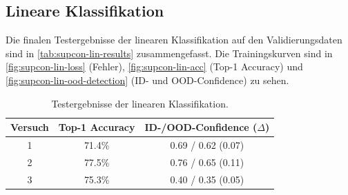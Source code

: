 \subsection{Lineare Klassifikation} \label{subsec:supcon-lin-results}

Die finalen Testergebnisse der linearen Klassifikation auf den Validierungsdaten sind in \autoref{tab:supcon-lin-results} zusammengefasst. Die Trainingskurven sind in \autoref{fig:supcon-lin-loss} (Fehler), \autoref{fig:supcon-lin-acc} (Top-1 Accuracy) und \autoref{fig:supcon-lin-ood-detection} (ID- und OOD-Confidence) zu sehen.

\begin{table}[h]
	\caption{Testergebnisse der linearen Klassifikation.}
	\begin{tabular}{|c|c|c|}
		\hline
		\textbf{Versuch} & \textbf{Top-1 Accuracy} & \textbf{ID-/OOD-Confidence ($\Delta$)} \\
		\hline
		1 & 71.4\% & 0.69 / 0.62 (0.07) \\
		2 & 77.5\% & 0.76 / 0.65 (0.11) \\
		3 & 75.3\% & 0.40 / 0.35 (0.05) \\
		\hline
	\end{tabular}
	\label{tab:supcon-lin-results}
\end{table}

